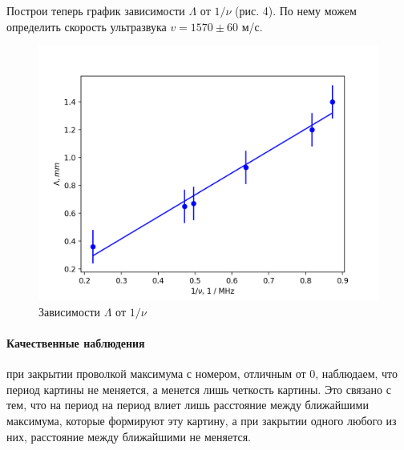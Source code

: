 \documentclass[a4paper,12pt]{article}
\begin{document}
\noindent
Построи теперь график зависимости $\Lambda$ от $1/\nu$ (рис. 4). По нему можем определить скорость ультразвука $v = 1570 \pm 60$ м/с. 

\begin{figure}[H]
    \centering
    \includegraphics[scale=0.9]{2.png}
    \caption{Зависимости $\Lambda$ от $1/\nu$}
\end{figure}

\paragraph{Качественные наблюдения} при закрытии проволкой максимума с номером, отличным от 0, наблюдаем, что период картины не меняется, а менется лишь четкость картины. Это связано с тем, что на период на период влиет лишь расстояние между ближайшими максимума, которые формируют эту картину, а при закрытии одного любого из них, расстояние между ближайшими не меняется.
\end{document}
